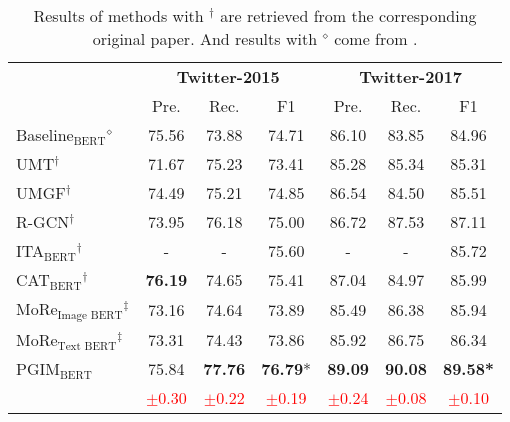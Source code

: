 \documentclass[11pt]{article}
\begin{document}
\begin{table}[t!]
\small
\setlength\tabcolsep{1.6pt}
\renewcommand{\arraystretch}{1.2}
\centering
\begin{tabular}{l|cccccc}
\toprule
& \multicolumn{3}{c|}{\textbf{Twitter-2015}} & \multicolumn{3}{c}{\textbf{Twitter-2017}}\\
& Pre. & Rec. & \multicolumn{1}{c|}{F1}  & Pre. & Rec. & \multicolumn{1}{c}{F1}    \\
\midrule
Baseline$_{\text{BERT}}$$^\diamond$   & 75.56 &  73.88 & \multicolumn{1}{c|}{74.71}  & 86.10 & 83.85 & 84.96  \\
UMT$^\dag$    & 71.67 & 75.23 & \multicolumn{1}{c|}{73.41}  & 85.28 & 85.34 & 85.31  \\
UMGF$^\dag$    & 74.49  & 75.21 & \multicolumn{1}{c|}{74.85}  & 86.54  & 84.50 & 85.51  \\
R-GCN$^\dag$    & 73.95  & 76.18 & \multicolumn{1}{c|}{75.00}  & 86.72  & 87.53 & 87.11  \\
ITA$_{\text{BERT}}$$^\dag$ & -  & - & \multicolumn{1}{c|}{75.60}  & -  & - & 85.72  \\
CAT$_{\text{BERT}}$$^\dag$  & \textbf{76.19} & 74.65 & \multicolumn{1}{c|}{75.41} & 87.04 & 84.97 & 85.99 \\
MoRe$_{\text{Image BERT}}$$^\ddag$ & 73.16 & 74.64 & \multicolumn{1}{c|}{73.89} & 85.49 & 86.38 & 85.94 \\
MoRe$_{\text{Text BERT}}$$^\ddag$ & 73.31 & 74.43 & \multicolumn{1}{c|}{73.86} & 85.92 & 86.75 & 86.34 \\
PGIM$_{\text{BERT}}$ & 75.84 & \textbf{77.76} & \multicolumn{1}{c|}{\textbf{76.79}*} & \textbf{89.09} & \textbf{90.08} & \textbf{89.58*} \\
     & \textcolor{red}{$\pm$0.30} & \textcolor{red}{$\pm$0.22} & \multicolumn{1}{c|}{\textcolor{red}{$\pm$0.19}} & \textcolor{red}{$\pm$0.24} & \textcolor{red}{$\pm$0.08} & \textcolor{red}{$\pm$0.10}\\ 
\bottomrule
\end{tabular}
\caption{Results of methods with $^\dag$ are retrieved from the corresponding original paper. And results with $^\diamond$ come from  \citet{wang2022cat}.}
\label{tab:PGIM BERT}
\end{table}
\end{document}
